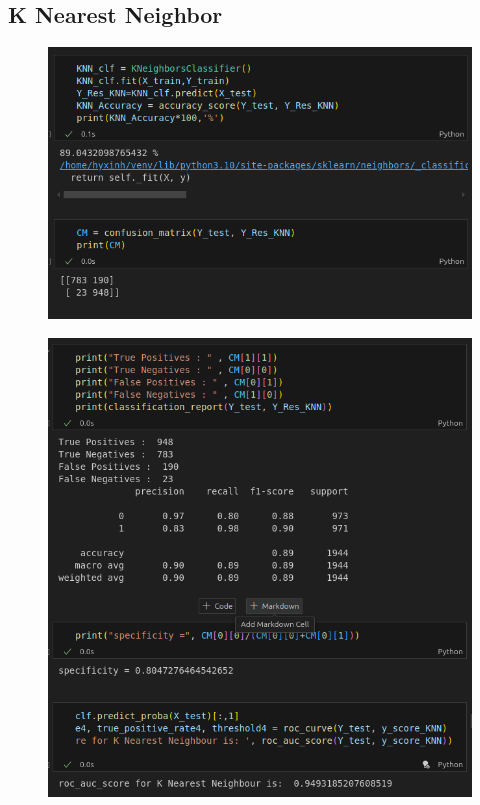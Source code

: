 \documentclass[11pt]{article}
\begin{document}
	\subsection{K Nearest Neighbor}
	
	\begin{figure}[H]
		\centering
		\includegraphics[width=0.7\linewidth]{KNN/screenshot006}
		\caption{}
		\label{fig:screenshot006}
	\end{figure}
	
	\begin{figure}[H]
		\centering
		\includegraphics[width=0.7\linewidth]{KNN/screenshot007}
		\caption{}
		\label{fig:screenshot007}
	\end{figure}
	
\end{document}
